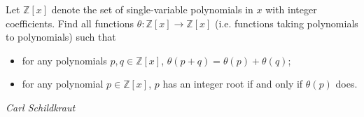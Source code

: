 Let $\mathbb{Z}[x]$ denote the set of single-variable polynomials in $x$ with integer coefficients. Find all functions $\theta : \mathbb{Z}[x] \to \mathbb{Z}[x]$ (i.e. functions taking polynomials to polynomials)
such that
\begin{itemize}
	\item for any polynomials $p, q \in \mathbb{Z}[x]$, $\theta(p + q) = \theta(p) + \theta(q)$;
	\item for any polynomial $p \in \mathbb{Z}[x]$, $p$ has an integer root if and only if $\theta(p)$ does.
\end{itemize}

\textit{Carl Schildkraut}